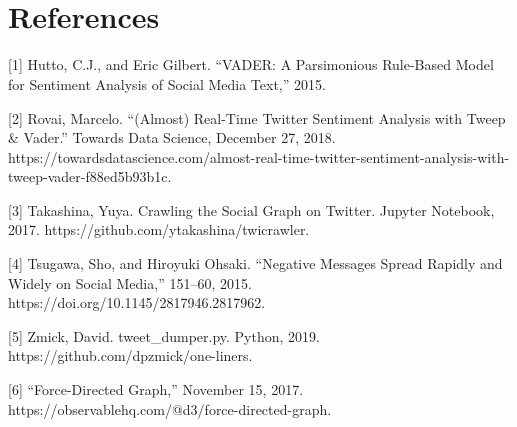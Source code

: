 \documentclass[11pt]{article}
\begin{document}
\section{\\References}

[1] Hutto, C.J., and Eric Gilbert. “VADER: A Parsimonious Rule-Based Model for Sentiment Analysis of Social Media Text,” 2015.\newline

[2] Rovai, Marcelo. “(Almost) Real-Time Twitter Sentiment Analysis with Tweep \& Vader.” Towards Data Science, December 27, 2018. https://towardsdatascience.com/almost-real-time-twitter-sentiment-analysis-with-tweep-vader-f88ed5b93b1c.\newline

[3] Takashina, Yuya. Crawling the Social Graph on Twitter. Jupyter Notebook, 2017.\newline
https://github.com/ytakashina/twicrawler.\newline

[4] Tsugawa, Sho, and Hiroyuki Ohsaki. “Negative Messages Spread Rapidly and Widely on Social Media,” 151–60, 2015. https://doi.org/10.1145/2817946.2817962.\newline

[5] Zmick, David. tweet\_dumper.py. Python, 2019. https://github.com/dpzmick/one-liners.

[6] “Force-Directed Graph,” November 15, 2017. https://observablehq.com/@d3/force-directed-graph.
\end{document}
